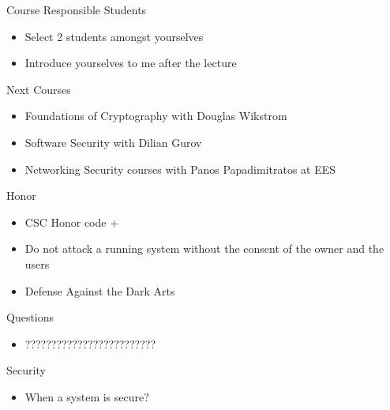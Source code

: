 \documentclass{beamer}
\begin{document}
\begin{frame}{Course Responsible Students }
  \begin{itemize}
  \item Select 2 students amongst yourselves 
  \item Introduce yourselves to me after the lecture 
  \end{itemize}
\end{frame}


\begin{frame}{Next Courses}
  \begin{itemize}
  \item Foundations of Cryptography with Douglas Wikstr\:om
  \item Software Security with Dilian Gurov
  \item Networking Security courses with Panos
    Papadimitratos at EES
  \end{itemize}
\end{frame}

\begin{frame}{Honor}
  \begin{itemize}
  \item CSC Honor code +
  \item \alert{Do not attack a running system 
    without the consent of the owner 
    and the users}
  \item Defense Against the Dark Arts
  \end{itemize}
\end{frame}

\begin{frame}{Questions}
  \begin{itemize}
  \item ?????????????????????????
  \end{itemize}
\end{frame}



\begin{frame}{Security}
  \begin{itemize}
  \item When a system is secure?
  \end{itemize}
\end{frame}
\end{document}
